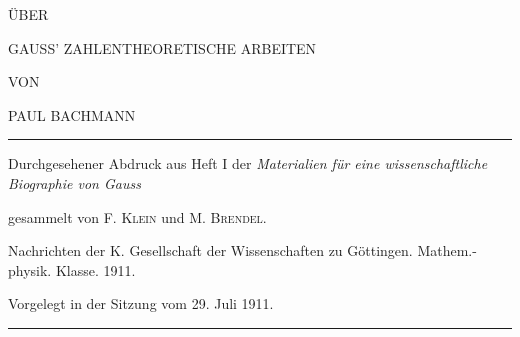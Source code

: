 \clearpage\NoSourceHead{}
\begin{center}
\vspace*{2em}
{\Large ÜBER\par}
\vspace{1em}
{\Large GAUSS’ ZAHLENTHEORETISCHE ARBEITEN\par}
\vspace{3em}
VON\par
\vspace{2em}
{\Large PAUL BACHMANN\par}
\end{center}
\vfill
\hrule\smallskip
\begin{center}\small
Durchgesehener Abdruck aus Heft I der \textit{Materialien für eine wissenschaftliche Biographie von Gauss}\par
gesammelt von F. \textsc{Klein} und M. \textsc{Brendel}.\par
Nachrichten der K. Gesellschaft der Wissenschaften zu Göttingen. Mathem.-physik. Klasse. 1911.\par
Vorgelegt in der Sitzung vom 29. Juli 1911.
\end{center}
\smallskip\hrule
\vspace{2em}
\clearpage

